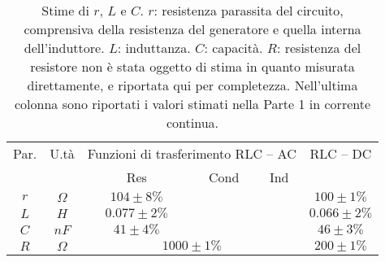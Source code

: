 \begin{table}[H]
\begin{center}
\begin{tabular}{|c|c|c|c|c|c|}

\hline
\multicolumn{ 1}{|c|}{Par.} & \multicolumn{ 1}{c|}{U.tà} & \multicolumn{ 3}{c|}{Funzioni di trasferimento RLC – AC} & \multicolumn{ 1}{c|}{RLC – DC} \\ \cline{3-5}

\multicolumn{ 1}{|c|}{} & \multicolumn{ 1}{c|}{} & Res & Cond & Ind & \multicolumn{ 1}{c|}{} \\ \hline

$r$ & $\Omega$ & $104\pm8\%$ &  &  & $100\pm1\%$ \\ 
$L$ & $H$ & $0.077\pm2\%$ &  &  & $0.066\pm2\%$ \\ 
$C$ & $nF$ & $41\pm4\%$ &  &  & $46\pm3\%$ \\ \hline
$R$ & $\Omega$ & \multicolumn{ 3}{c|}{$1000\pm1\%$} & $200\pm1\%$ \\ 
\hline

\end{tabular}
\end{center}
\caption{
Stime di $r$, $L$ e $C$.
$r$: resistenza parassita del circuito, comprensiva della resistenza del generatore e quella interna dell'induttore.
$L$: induttanza.
$C$: capacità.
$R$: resistenza del resistore non è stata oggetto di stima in quanto misurata direttamente, e riportata qui per completezza.
Nell'ultima colonna sono riportati i valori stimati nella Parte 1 in corrente continua.
}
\label{C4_P2_finale}
\end{table}

